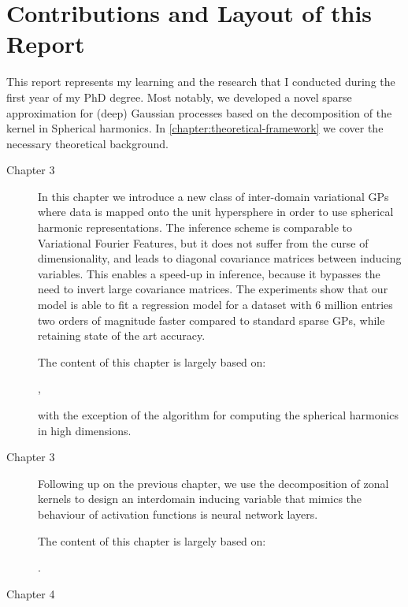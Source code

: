 \section{Contributions and Layout of this Report}

This report represents my learning and the research that I conducted during the first year of my PhD degree. Most notably, we developed a novel sparse approximation for (deep) Gaussian processes based on the decomposition of the kernel in Spherical harmonics. In \cref{chapter:theoretical-framework} we cover the necessary theoretical background.

\begin{description}
    \item[Chapter 3] In this chapter we introduce a new class of inter-domain variational GPs where data is mapped onto the unit hypersphere in order to use spherical harmonic representations. The inference scheme is comparable to Variational Fourier Features, but it does not suffer from the curse of dimensionality, and leads to diagonal covariance matrices between inducing variables. This enables a speed-up in inference, because it bypasses the need to invert large covariance matrices. The experiments show that our model is able to fit a regression model for a dataset with 6 million entries two orders of magnitude faster compared to standard sparse GPs, while retaining state of the art accuracy.
    
    The content of this chapter is largely based on:

    ,

    with the exception of the algorithm for computing the spherical harmonics in high dimensions.

    \item[Chapter 3] Following up on the previous chapter, we use the decomposition of zonal kernels to design an interdomain inducing variable that mimics the behaviour of activation functions is neural network layers. 

    The content of this chapter is largely based on:

    .

    \item[Chapter 4]
\end{description}
